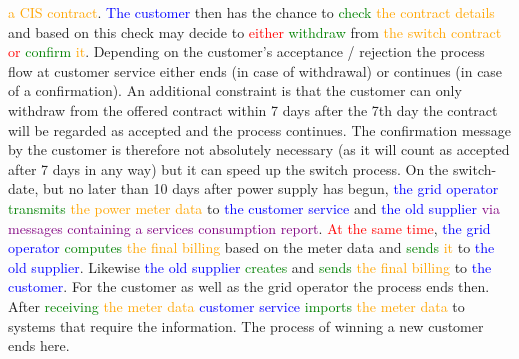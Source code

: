 \textcolor{orange}{a} \textcolor{orange}{CIS} \textcolor{orange}{contract}. \textcolor{blue}{The} \textcolor{blue}{customer} then has the chance to \textcolor{green}{check} \textcolor{orange}{the} \textcolor{orange}{contract} \textcolor{orange}{details} and based on this check may decide to \textcolor{red}{either} \textcolor{green}{withdraw} from \textcolor{orange}{the} \textcolor{orange}{switch} \textcolor{orange}{contract} \textcolor{red}{or} \textcolor{green}{confirm} \textcolor{orange}{it}. Depending on the customer's acceptance / rejection the process flow at customer service either ends (in case of withdrawal) or continues (in case of a confirmation). An additional constraint is that the customer can only withdraw from the offered contract within 7 days after the 7th day the contract will be regarded as accepted and the process continues. The confirmation message by the customer is therefore not absolutely necessary (as it will count as accepted after 7 days in any way) but it can speed up the switch process. On the switch-date, but no later than 10 days after power supply has begun, \textcolor{blue}{the} \textcolor{blue}{grid} \textcolor{blue}{operator} \textcolor{green}{transmits} \textcolor{orange}{the} \textcolor{orange}{power} \textcolor{orange}{meter} \textcolor{orange}{data} to \textcolor{blue}{the} \textcolor{blue}{customer} \textcolor{blue}{service} and \textcolor{blue}{the} \textcolor{blue}{old} \textcolor{blue}{supplier} \textcolor{purple}{via} \textcolor{purple}{messages} \textcolor{purple}{containing} \textcolor{purple}{a} \textcolor{purple}{services} \textcolor{purple}{consumption} \textcolor{purple}{report}. \textcolor{red}{At} \textcolor{red}{the} \textcolor{red}{same} \textcolor{red}{time}, \textcolor{blue}{the} \textcolor{blue}{grid} \textcolor{blue}{operator} \textcolor{green}{computes} \textcolor{orange}{the} \textcolor{orange}{final} \textcolor{orange}{billing} based on the meter data and \textcolor{green}{sends} \textcolor{orange}{it} to \textcolor{blue}{the} \textcolor{blue}{old} \textcolor{blue}{supplier}. Likewise \textcolor{blue}{the} \textcolor{blue}{old} \textcolor{blue}{supplier} \textcolor{green}{creates} and \textcolor{green}{sends} \textcolor{orange}{the} \textcolor{orange}{final} \textcolor{orange}{billing} to \textcolor{blue}{the} \textcolor{blue}{customer}. For the customer as well as the grid operator the process ends then. After \textcolor{green}{receiving} \textcolor{orange}{the} \textcolor{orange}{meter} \textcolor{orange}{data} \textcolor{blue}{customer} \textcolor{blue}{service} \textcolor{green}{imports} \textcolor{orange}{the} \textcolor{orange}{meter} \textcolor{orange}{data} to systems that require the information. The process of winning a new customer ends here.


